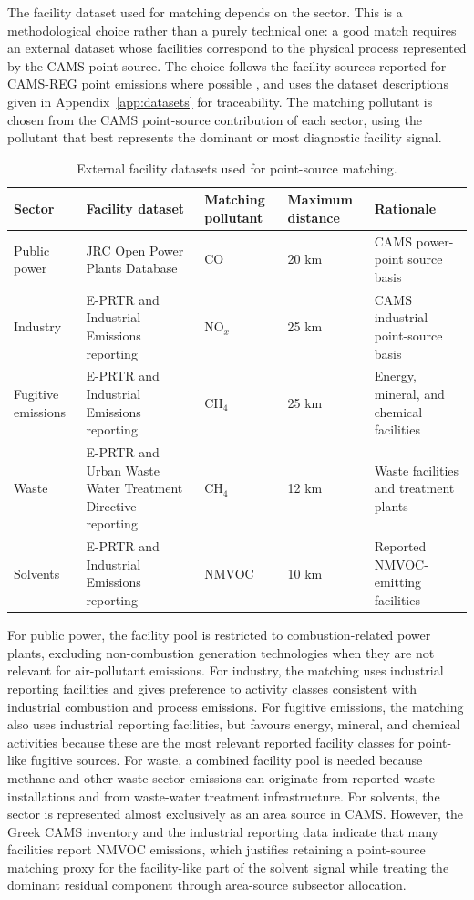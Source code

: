 The facility dataset used for matching depends on the sector. This is a
methodological choice rather than a purely technical one: a good match
requires an external dataset whose facilities correspond to the physical
process represented by the CAMS point source. The choice follows the
facility sources reported for CAMS-REG point emissions where possible
\citep{CAMS-REG-v4}, and uses the dataset descriptions given in
Appendix~\ref{app:datasets} for traceability. The matching pollutant is
chosen from the CAMS point-source contribution of each sector, using the
pollutant that best represents the dominant or most diagnostic facility
signal.

\begin{table}[htbp]
  \centering
  \caption{External facility datasets used for point-source matching.}
  \label{tab:point-source-facility-datasets}
  \footnotesize
  \begin{tabular}{p{} p{} p{} p{} p{}}
    \toprule
    Sector & Facility dataset & Matching pollutant & Maximum distance & Rationale \\
    \midrule
    Public power & JRC Open Power Plants Database & CO & 20 km & CAMS power-point source basis \\
    Industry & E-PRTR and Industrial Emissions reporting & NO$_x$ & 25 km & CAMS industrial point-source basis \\
    Fugitive emissions & E-PRTR and Industrial Emissions reporting & CH$_4$ & 25 km & Energy, mineral, and chemical facilities \\
    Waste & E-PRTR and Urban Waste Water Treatment Directive reporting & CH$_4$ & 12 km & Waste facilities and treatment plants \\
    Solvents & E-PRTR and Industrial Emissions reporting & NMVOC & 10 km & Reported NMVOC-emitting facilities \\
    \bottomrule
  \end{tabular}
\end{table}

For public power, the facility pool is restricted to combustion-related
power plants, excluding non-combustion generation technologies when they
are not relevant for air-pollutant emissions. For industry, the matching
uses industrial reporting facilities and gives preference to activity
classes consistent with industrial combustion and process emissions. For
fugitive emissions, the matching also uses industrial reporting
facilities, but favours energy, mineral, and chemical activities because
these are the most relevant reported facility classes for point-like
fugitive sources. For waste, a combined facility pool is needed because
methane and other waste-sector emissions can originate from reported
waste installations and from waste-water treatment infrastructure. For
solvents, the sector is represented almost exclusively as an area source
in CAMS. However, the Greek CAMS inventory and the industrial reporting
data indicate that many facilities report NMVOC emissions, which
justifies retaining a point-source matching proxy for the facility-like
part of the solvent signal while treating the dominant residual component
through area-source subsector allocation.

